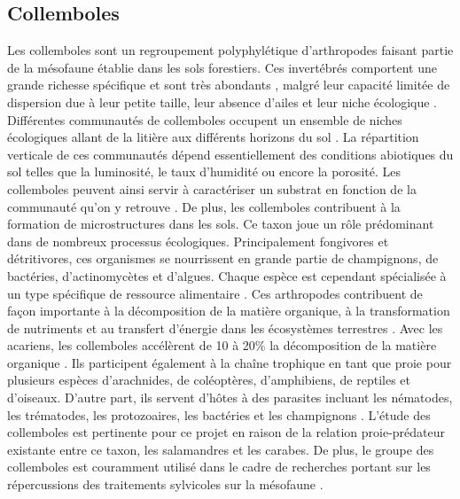 \subsection*{Collemboles}

Les collemboles sont un regroupement polyphylétique d'arthropodes faisant partie de la mésofaune établie dans les sols forestiers.
Ces invertébrés comportent une grande richesse spécifique et sont très abondants \citep{rusekBiodiversityCollembolaTheir1998}, 
malgré leur capacité limitée de dispersion due à leur petite taille, leur absence d’ailes et leur niche écologique \citep{Ojala2001Dispersalmicroarthropods}.
Différentes communautés de collemboles occupent un ensemble de niches écologiques allant de la litière aux différents horizons du sol \citep{pongeVerticalDistributionCollembola2000}.
La répartition verticale de ces communautés dépend essentiellement des conditions abiotiques du sol telles que la luminosité, le taux d’humidité ou encore la porosité.
Les collemboles peuvent ainsi servir à caractériser un substrat en fonction de la communauté qu’on y retrouve \citep{rusekBiodiversityCollembolaTheir1998}.
De plus, les collemboles contribuent à la formation de microstructures dans les sols. 
Ce taxon joue un rôle prédominant dans de nombreux processus écologiques. 
Principalement fongivores et détritivores, ces organismes se nourrissent en grande partie de champignons, de bactéries, d'actinomycètes et d'algues. 
Chaque espèce est cependant spécialisée à un type spécifique de ressource alimentaire \citep{Chen1995Foodpreference,rusekBiodiversityCollembolaTheir1998}.
Ces arthropodes contribuent de façon importante à la décomposition de la matière organique, à la transformation de nutriments et 
au transfert d’énergie dans les écosystèmes terrestres \citep{rusekBiodiversityCollembolaTheir1998,Hattenschwiler2005Biodiversitylitter,Cuchta2019importantrole,Marsden2020Howagroforestry}.
Avec les acariens, les collemboles accélèrent de 10 à 20\% la décomposition de la matière organique \citep{Hattenschwiler2005Biodiversitylitter}.
Ils participent également à la chaîne trophique en tant que proie pour plusieurs espèces d’arachnides, de coléoptères, d’amphibiens, de reptiles et d’oiseaux. 
D’autre part, ils servent d’hôtes à des parasites incluant les nématodes, les trématodes, les protozoaires, les bactéries et les champignons \citep{rusekBiodiversityCollembolaTheir1998}.
L'étude des collemboles est pertinente pour ce projet en raison de la relation proie-prédateur existante entre ce taxon, les salamandres et les carabes. 
De plus, le groupe des collemboles est couramment utilisé dans le cadre de recherches portant sur les répercussions des traitements sylvicoles sur la mésofaune \citep{Salmon2008Relationshipssoil,farskaManagementIntensityAffects2014,rousseauWoodyBiomassRemoval2019}.

